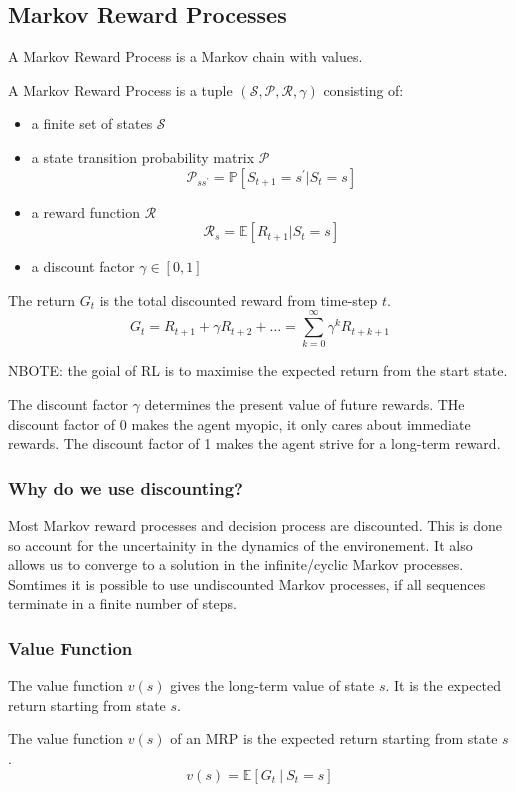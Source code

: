 \subsection{Markov Reward Processes}
A Markov Reward Process is a Markov chain with values.
\begin{definition}
    A Markov Reward Process is a tuple \((\mathcal{S}, \mathcal{P} , \mathcal{R} , \gamma)\)
    consisting of:
    \begin{itemize}
        \item a finite set of states \(\mathcal{S} \)
        \item a state transition probability matrix \(\mathcal{P} \)
        \[
            \mathcal{P} _{ss^{\prime}} = \mathbb{P}  [S_{t+1} = s^{\prime} | S_{t} = s]  
        \]
        \item a reward function \(\mathcal{R} \)
        \[
            \mathcal{R} _{s} = \mathbb{E}  [R_{t+1} | S_{t} = s]  
        \]
        \item a discount factor \(\gamma \in [0, 1]\)
    \end{itemize}
\end{definition}
\begin{definition}[Return]
    The return \(G_{t}\) is the total discounted reward from time-step \(t\).
    \[
        G_{t} = R_{t+1} + \gamma R_{t+2} + \dots = \sum_{k=0}^{\infty} \gamma^{k} R_{t+k+1}  
    \]
\end{definition}
NBOTE: the goial of RL is to maximise the expected return from the start state. 

The discount factor \(\gamma \) determines the present value of future rewards. THe discount
factor of 0 makes the agent myopic, it only cares about immediate rewards. The discount 
factor of 1 makes the agent strive for a long-term reward.

\subsubsection*{Why do we use discounting?}
Most Markov reward processes and decision process are discounted. This is done so account 
for the uncertainity in the dynamics of the environement. It also allows us to converge to
a solution in the infinite/cyclic Markov processes. Somtimes it is possible to 
use undiscounted Markov processes, if all sequences terminate in a finite number of steps.

\subsubsection{Value Function}
The value function \(v(s)\) gives the long-term value of state \(s\). It is the expected 
return starting from state \(s\).
\begin{definition}
    The value function \(v(s)\) of an MRP is the expected return starting from state \(s\).
    \[
        v(s) = \mathbb{E}  [ G_{t} \ |\  S_{t} = s]  
    \]
\end{definition}

